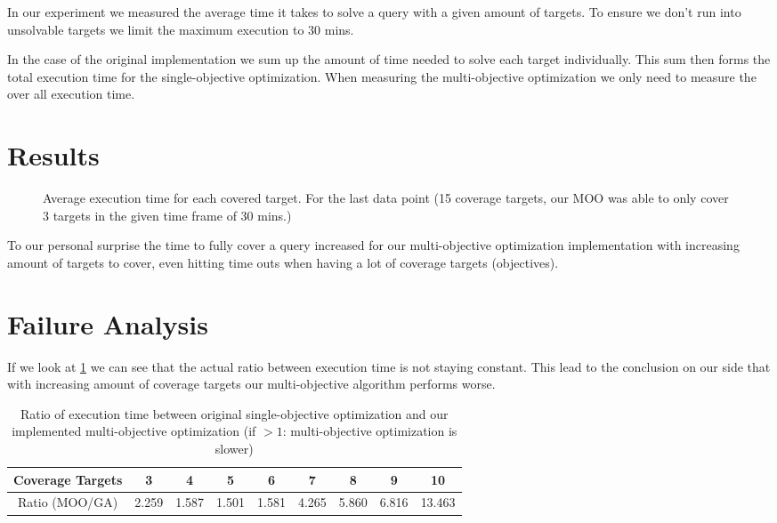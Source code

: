 In our experiment we measured the average time it takes to solve a query with a given amount of targets. To ensure we don't run into unsolvable targets we limit the maximum execution to 30 mins.

In the case of the original implementation we sum up the amount of time needed to solve each target individually. This sum then forms the total execution time for the single-objective optimization. When measuring the multi-objective optimization we only need to measure the over all execution time.

\section{Results}
\label{sec:results}

\begin{figure}
	\centering
	\caption{Average execution time for each covered target. For the last data point (15 coverage targets, our MOO was able to only cover 3 targets in the given time frame of 30 mins.)}
	\label{fig:execution_time_results}
\end{figure}

To our personal surprise the time to fully cover a query increased for our multi-objective optimization implementation with increasing amount of targets to cover, even hitting time outs when having a lot of coverage targets (objectives).

\section{Failure Analysis}

If we look at \cref{tbl:ratio_coverage_targets} we can see that the actual ratio between execution time is not staying constant. This lead to the conclusion on our side that with increasing amount of coverage targets our multi-objective algorithm performs worse.

\begin{table}
	\centering
	\label{tbl:ratio_coverage_targets}
	\caption{Ratio of execution time between original single-objective optimization and our implemented multi-objective optimization (if $>1$: multi-objective optimization is slower)}
	\begin{tabular}{c|c|c|c|c|c|c|c|c}
		Coverage Targets & 3 & 4 & 5 & 6 & 7 & 8 & 9 & 10 \\ 
		\hline
		Ratio (MOO/GA) & 2.259 & 1.587 & 1.501 & 1.581 & 4.265 & 5.860 & 6.816 & 13.463
	\end{tabular} 
\end{table}

